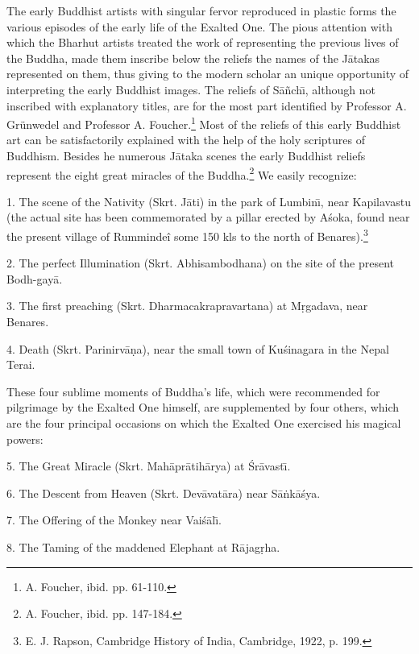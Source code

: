 \documentclass[a4paper, 12pt, oneside]{article}
\begin{document}
The early Buddhist artists with singular fervor reproduced in plastic forms the various episodes of the early life of the Exalted One. The pious attention with which the Bharhut artists treated the work of representing the previous lives of the Buddha, made them inscribe below the reliefs the names of the J\={a}takas represented on them, thus giving to the modern scholar an unique opportunity of interpreting the early Buddhist images. The reliefs of S\={a}\~{n}ch\={\i}, although not inscribed with explanatory titles, are for the most part identified by Professor A. Grünwedel and Professor A. Foucher.\footnote{A. Foucher, ibid. pp. 61-110.} Most of the reliefs of this early Buddhist art can be satisfactorily explained with the help of the holy scriptures of Buddhism. Besides he numerous J\={a}taka scenes the early Buddhist reliefs represent the eight great miracles of the Buddha.\footnote{A. Foucher, ibid. pp. 147-184.} We easily recognize:

1. The scene of the Nativity (Skrt. J\={a}ti) in the park of Lumbin\={\i}, near Kapilavastu (the actual site has been commemorated by a pillar erected by A\'{s}oka, found near the present village of Rummindeî some 150 kls to the north of Benares).\footnote{E. J. Rapson, Cambridge History of India, Cambridge, 1922, p. 199.}

2. The perfect Illumination (Skrt. Abhisambodhana) on the site of the present Bodh-gay\={a}.

3. The first preaching (Skrt. Dharmacakrapravartana) at M\d{r}gadava, near Benares.

4. Death (Skrt. Parinirv\={a}\d{n}a), near the small town of Ku\'{s}inagara in the Nepal Terai.

These four sublime moments of Buddha's life, which were recommended for pilgrimage by the Exalted One himself, are supplemented by four others, which are the four principal occasions on which the Exalted One exercised his magical powers:

5. The Great Miracle (Skrt. Mah\={a}pr\={a}tih\={a}rya) at \'{S}r\={a}vast\={\i}.

6. The Descent from Heaven (Skrt. Dev\={a}vat\={a}ra) near S\={a}\.{n}k\={a}\'{s}ya.

7. The Offering of the Monkey near Vai\'{s}\={a}l\={\i}.

8. The Taming of the maddened Elephant at R\={a}jag\d{r}ha.
\end{document}
